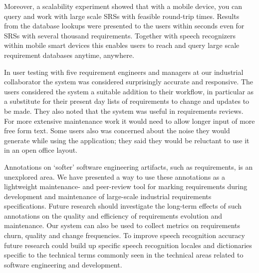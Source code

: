 Moreover, a scalability experiment showed that with a mobile device, you can query and work with large scale SRSs with feasible round-trip times. 
Results from the database lookups were presented to the users within seconds even for SRSs with several thousand requirements.
Together with speech recognizers within mobile smart devices this enables users to reach and query large scale requirement databases anytime, anywhere.

In user testing with five requirement engineers and managers at our industrial collaborator the system was considered surprisingly 
accurate and responsive.
The users considered the system a suitable addition to their workflow, in particular as a substitute for their present day lists of requirements to change and updates to be made.
They also noted that the system was useful in requirements reviews.
For more extensive maintenance work it would need to allow longer input of more free form text.
Some users also was concerned about the noise they would generate while using the application; they said they would be reluctant to use it in an open office layout.

Annotations on `softer' software engineering artifacts, such as requirements, is an unexplored area. 
We have presented a way to use these annotations as a lightweight maintenance- and peer-review tool for marking requirements during development and maintenance of large-scale industrial requirements specifications. 
Future research should investigate the long-term effects of such annotations on the quality and efficiency of requirements evolution and maintenance.
Our system can also be used to collect metrics on requirements churn, quality and change frequencies.
To improve speech recognition accuracy future research could build up specific speech recognition locales and dictionaries specific to the technical terms commonly seen in the technical areas related to software engineering and development.

